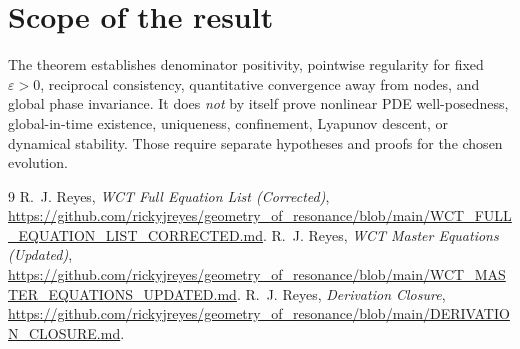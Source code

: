 \documentclass[11pt]{article}
\newcommand{\eps}{\varepsilon}
\begin{document}
\section{Scope of the result}

The theorem establishes denominator positivity, pointwise regularity
for fixed $\eps>0$, reciprocal consistency, quantitative convergence
away from nodes, and global phase invariance. It does \emph{not}
by itself prove nonlinear PDE well-posedness, global-in-time existence,
uniqueness, confinement, Lyapunov descent, or dynamical stability.
Those require separate hypotheses and proofs for the chosen evolution.

\begin{thebibliography}{9}
R.~J. Reyes, \emph{WCT Full Equation List (Corrected)},
\url{https://github.com/rickyjreyes/geometry_of_resonance/blob/main/WCT_FULL_EQUATION_LIST_CORRECTED.md}.
R.~J. Reyes, \emph{WCT Master Equations (Updated)},
\url{https://github.com/rickyjreyes/geometry_of_resonance/blob/main/WCT_MASTER_EQUATIONS_UPDATED.md}.
R.~J. Reyes, \emph{Derivation Closure},
\url{https://github.com/rickyjreyes/geometry_of_resonance/blob/main/DERIVATION_CLOSURE.md}.
\end{thebibliography}
\end{document}
